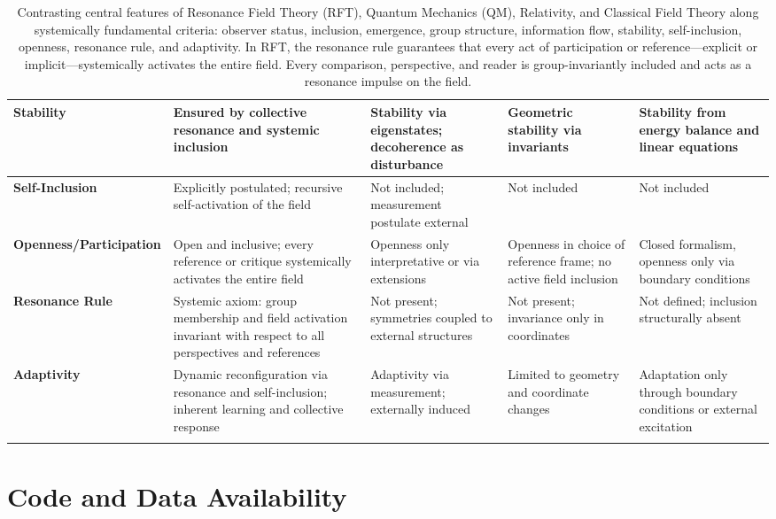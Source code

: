 \documentclass[12pt]{iopart}
\begin{document}
\begin{center}
\begin{longtable}{|p{4cm}|p{3cm}|p{3cm}|p{3cm}|p{3cm}|}
		\textbf{Stability} & Ensured by collective resonance and systemic inclusion & Stability via eigenstates; decoherence as disturbance & Geometric stability via invariants & Stability from energy balance and linear equations \\
		\hline
		
		\textbf{Self-Inclusion} & Explicitly postulated; recursive self-activation of the field & Not included; measurement postulate external & Not included & Not included \\
		\hline
		
		\textbf{Openness/Participation} & Open and inclusive; every reference or critique systemically activates the entire field & Openness only interpretative or via extensions & Openness in choice of reference frame; no active field inclusion & Closed formalism, openness only via boundary conditions \\
		\hline
		
		\textbf{Resonance Rule} & Systemic axiom: group membership and field activation invariant with respect to all perspectives and references & Not present; symmetries coupled to external structures & Not present; invariance only in coordinates & Not defined; inclusion structurally absent \\
		\hline
		
		\textbf{Adaptivity} & Dynamic reconfiguration via resonance and self-inclusion; inherent learning and collective response & Adaptivity via measurement; externally induced & Limited to geometry and coordinate changes & Adaptation only through boundary conditions or external excitation \\
		\hline
		
		\caption{Contrasting central features of Resonance Field Theory (RFT), Quantum Mechanics (QM), Relativity, and Classical Field Theory along systemically fundamental criteria: observer status, inclusion, emergence, group structure, information flow, stability, self-inclusion, openness, resonance rule, and adaptivity. In RFT, the resonance rule guarantees that every act of participation or reference—explicit or implicit—systemically activates the entire field. Every comparison, perspective, and reader is group-invariantly included and acts as a resonance impulse on the field.}
		\label{tab:rft_comparison}
	\end{longtable}
\end{center}

\section*{Code and Data Availability}
\end{document}
